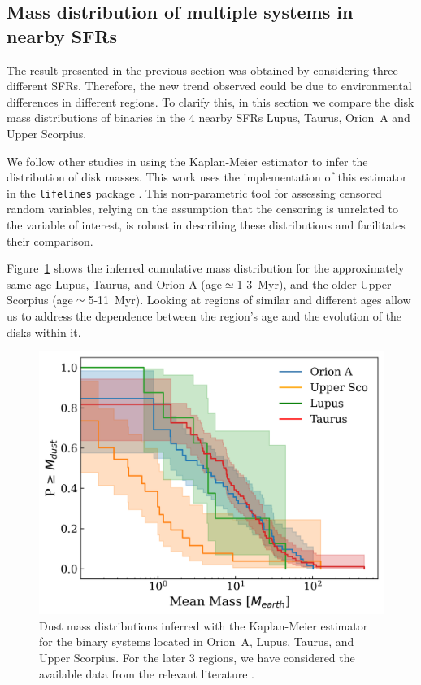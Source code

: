 \documentclass{aa}
\begin{document}
\subsection{Mass distribution of multiple systems in nearby SFRs} \label{section:nearbySFRs}

The result presented in the previous section was obtained by considering three different SFRs. Therefore, the new trend observed could be due to environmental differences in different regions. To clarify this, in this section we compare the disk mass distributions of binaries in the 4 nearby SFRs Lupus, Taurus, Orion~A and Upper Scorpius. \par
We follow other studies \citep[e.g.,][]{Zurlo21, Testi22, vanTerwisga22, Grant21, Cazzoletti19} in using the Kaplan-Meier estimator to infer the distribution of disk masses. This work uses the implementation of this estimator in the \texttt{lifelines} package \citep{cameron_davidson_pilon_2020_3629409}. This non-parametric tool for assessing censored random variables, relying on the assumption that the censoring is unrelated to the variable of interest, is robust in describing these distributions and facilitates their comparison. \par
Figure~\ref{figure:literature} shows the inferred cumulative mass distribution for the approximately same-age Lupus, Taurus, and Orion A (age$\simeq$1-3~Myr), and the older Upper Scorpius (age$\simeq$5-11~Myr). Looking at regions of similar and different ages allow us to address the dependence between the region's age and the evolution of the disks within it. 

\begin{figure}
\centering
   \includegraphics[width=\columnwidth]{Multiples_Comparison.png}
     \caption{Dust mass distributions inferred with the Kaplan-Meier estimator for the binary systems located in Orion~A, Lupus, Taurus, and Upper Scorpius. For the later 3 regions, we have considered the available data from the relevant literature \citep{Zurlo21, Ansdell18, Akeson19, Manara19, Akeson14, Harris_2012, Barenfeld_2019}.}
     \label{figure:literature}
\end{figure}
\end{document}
